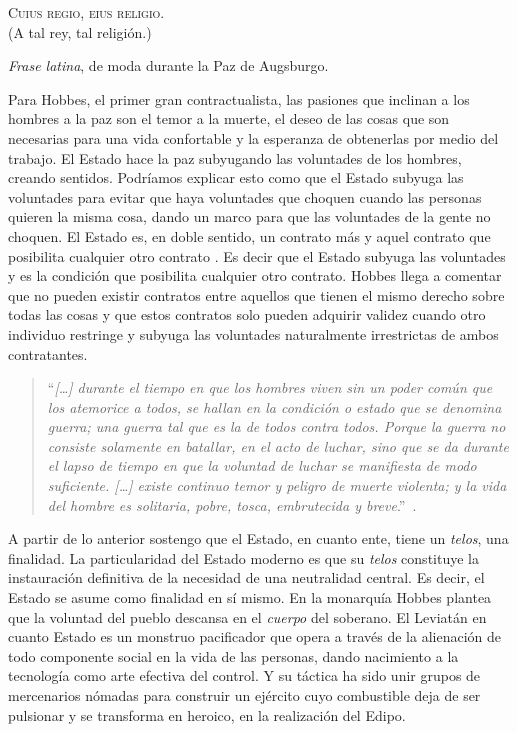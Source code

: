 \epigraph{\textsc{Cuius regio, eius religio}.\\ (\textsf{A tal rey, tal religión}.)}{\emph{Frase latina}, de moda durante la Paz de Augsburgo.}

Para Hobbes, el primer gran contractualista, las pasiones que inclinan a los hombres a la paz son el temor a la muerte, el deseo de las cosas que son necesarias para una vida confortable y la esperanza de obtenerlas por medio del trabajo. El Estado hace la paz subyugando las voluntades de los hombres, creando sentidos. Podríamos explicar esto como que el Estado subyuga las voluntades para evitar que haya voluntades que choquen cuando las personas quieren la misma cosa, dando un marco para que las voluntades de la gente no choquen. El Estado es, en doble sentido, un contrato más y aquel contrato que posibilita cualquier otro contrato \autocite{hobbesLeviatan2007}. Es decir que el Estado subyuga las voluntades y es la condición que posibilita cualquier otro contrato. Hobbes llega a comentar que no pueden existir contratos entre aquellos que tienen el mismo derecho sobre todas las cosas \autocite{hobbesLeviatan2007} y que estos contratos solo pueden adquirir validez cuando otro individuo restringe y subyuga las voluntades naturalmente irrestrictas de ambos contratantes.

\begin{quote}
  \enquote{\emph{[\ldots] durante el tiempo en que los hombres viven sin un poder común que los atemorice a todos, se hallan en la condición o estado que se denomina guerra; una guerra tal que es la de todos contra todos. Porque la guerra no consiste solamente en batallar, en el acto de luchar, sino que se da durante el lapso de tiempo en que la voluntad de luchar se manifiesta de modo suficiente. [\ldots] existe continuo temor y peligro de muerte violenta; y la vida del hombre es solitaria, pobre, tosca, embrutecida y breve}.}~\autocite[Capítulo 13]{hobbesLeviatan2007}.
\end{quote}

A partir de lo anterior sostengo que el Estado, en cuanto ente, tiene un \emph{telos}, una finalidad. La particularidad del Estado moderno es que su \emph{telos} constituye la instauración definitiva de la necesidad de una neutralidad central. Es decir, el Estado se asume como finalidad en sí mismo. En la monarquía Hobbes plantea que la voluntad del pueblo descansa en el \emph{cuerpo} del soberano. El Leviatán en cuanto Estado es un monstruo pacificador que opera a través de la alienación de todo componente social en la vida de las personas, dando nacimiento a la tecnología como arte efectiva del control. Y su táctica ha sido unir grupos de mercenarios nómadas para construir un ejército cuyo combustible deja de ser pulsionar y se transforma en heroico, en la realización del Edipo.

